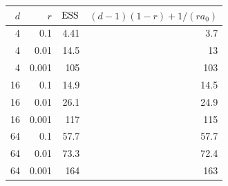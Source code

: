 \begin{tabular}{rrrr}
\toprule
$d$ & $r$ & $\mathrm{ESS}$ & $(d-1)(1-r) + 1/(r a_0)$ \\
\midrule
4 & 0.1 & 4.41 & 3.7 \\
4 & 0.01 & 14.5 & 13 \\
4 & 0.001 & 105 & 103 \\
16 & 0.1 & 14.9 & 14.5 \\
16 & 0.01 & 26.1 & 24.9 \\
16 & 0.001 & 117 & 115 \\
64 & 0.1 & 57.7 & 57.7 \\
64 & 0.01 & 73.3 & 72.4 \\
64 & 0.001 & 164 & 163 \\
\bottomrule
\end{tabular}
